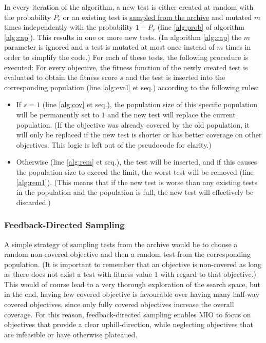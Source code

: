 \documentclass[
  a4paper,  %
  twoside,  %
  bibliography=totoc,
  headsepline,
  cleardoublepage=empty,
  parskip=half,
  draft=false
]{scrbook}
\begin{document}
In every iteration of the algorithm, a new test is either created at random with the probability $P_r$ or an existing test is \hyperref[sec:sampl]{sampled from the archive} and mutated $m$ times independently with the probability $1 - P_r$ (line \ref{alg:prob} of algorithm \ref{alg:cap}).
This results in one or more new tests.
(In algorithm \ref{alg:cap} the $m$ parameter is ignored and a test is mutated at most once instead of $m$ times in order to simplify the code.)
For each of these tests, the following procedure is executed:
For every objective, the fitness function of the newly created test is evaluated to obtain the fitness score $s$ and the test is inserted into the corresponding population (line \ref{alg:eval} et seq.) according to the following rules:
\begin{itemize}
	\item If $s = 1$ (line \ref{alg:cov} et seq.), the population size of this specific population will be permanently set to $1$ and the new test will replace the current population. (If the objective was already covered by the old population, it will only be replaced if the new test is shorter or has better coverage on other objectives. This logic is left out of the pseudocode for clarity.)
	\item Otherwise (line \ref{alg:rem} et seq.), the test will be inserted, and if this causes the population size to exceed the limit, the worst test will be removed (line \ref{alg:rem1}). (This means that if the new test is worse than any existing tests in the population and the population is full, the new test will effectively be discarded.)
\end{itemize}

\subsubsection{Feedback-Directed Sampling}\label{sec:sampl}
A simple strategy of sampling tests from the archive would be to choose a random non-covered objective and then a random test from the corresponding population. (It is important to remember that an objective is non-covered as long as there does not exist a test with fitness value $1$ with regard to that objective.)
This would of course lead to a very thorough exploration of the search space, but in the end, having few covered objective is favourable over having many half-way covered objectives, since only fully covered objectives increase the overall coverage.
For this reason, feedback-directed sampling enables MIO to focus on objectives that provide a clear uphill-direction, while neglecting objectives that are infeasible or have otherwise plateaued.
\end{document}
